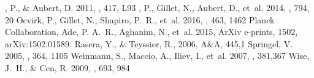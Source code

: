 \documentclass[twocolumn]{aastex61}
\begin{document}
\begin{thebibliography}{}
, P., \& {Aubert}, D. 2011, \mnras, 417, L93
, P., {Gillet}, N., {Aubert}, D., {et~al.} 2014, \apj, 794, 20
 {Ocvirk}, P., {Gillet}, N., {Shapiro}, P.~R., {et~al.} 2016, \mnras, 463, 1462
 {Planck Collaboration}, Ade, P. A.~R., Aghanim, N., {et~al.} 2015, ArXiv e-prints, 1502, arXiv:1502.01589.
 {Rasera}, Y., \& {Teyssier}, R., 2006, A\&A, 445,1
 {Springel}, V. 2005, \mnras, 364, 1105
 {Weinmann}, S., {Maccio}, A., {Iliev}, I., {et~al.} 2007, \mnras, 381,367
 {Wise}, J.~H., \& {Cen}, R. 2009, \apj, 693, 984


\end{thebibliography}


\end{document}
